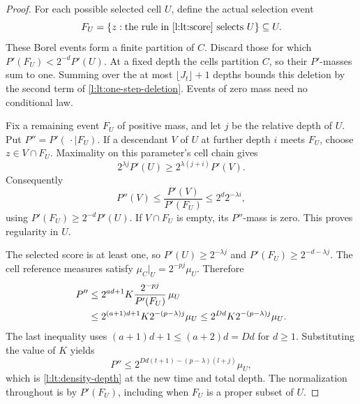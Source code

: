 \begin{proof}
For each possible selected cell $U$, define the actual selection event
\begin{equation}\label{l:lt:selection-event}
 F_U=\{z:\text{the rule in \eqref{l:lt:score} selects }U\}\subseteq U.
\end{equation}
These Borel events form a finite partition of $C$.  Discard those for
which
$P'(F_U)<2^{-d}P'(U)$.  At a fixed depth the cells partition $C$,
so their $P'$-masses sum to one.  Summing over the at most
$\lfloor J_t\rfloor+1$ depths bounds this deletion by the second term
of \eqref{l:lt:one-step-deletion}.  Events of zero mass need no
conditional law.

Fix a remaining event $F_U$ of positive mass, and let $j$ be the
relative depth of $U$.  Put $P''=P'(\,\cdot\mid F_U)$.  If a
descendant $V$ of $U$ at further depth $i$ meets $F_U$, choose
$z\in V\cap F_U$.  Maximality on this parameter's cell chain gives
\[
 2^{\lambda j}P'(U)\ge2^{\lambda(j+i)}P'(V).
\]
Consequently
\[
 P''(V)\le\frac{P'(V)}{P'(F_U)}
 \le2^d2^{-\lambda i},
\]
using $P'(F_U)\ge2^{-d}P'(U)$.  If $V\cap F_U$ is empty, its
$P''$-mass is zero.  This proves regularity in $U$.

The selected score is at least one, so
$P'(U)\ge2^{-\lambda j}$ and
$P'(F_U)\ge2^{-d-\lambda j}$.  The cell reference measures satisfy
$\mu_C|_U=2^{-pj}\mu_U$.  Therefore
\begin{align}
 P''
 &\le2^{ad+1}K
       \frac{2^{-pj}}{P'(F_U)}\,\mu_U\notag\\
 &\le2^{(a+1)d+1}K2^{-(p-\lambda)j}\mu_U
 \le2^{Dd}K2^{-(p-\lambda)j}\mu_U. \label{l:lt:depth-update}
\end{align}
The last inequality uses $(a+1)d+1\le(a+2)d=Dd$ for $d\ge1$.
Substituting the value of $K$ yields
\[
 P''\le2^{Dd(t+1)-(p-\lambda)(l+j)}\mu_U,
\]
which is \eqref{l:lt:density-depth} at the new time and total depth.
The normalization throughout is by $P'(F_U)$, including when
$F_U$ is a proper subset of $U$.
\end{proof}


